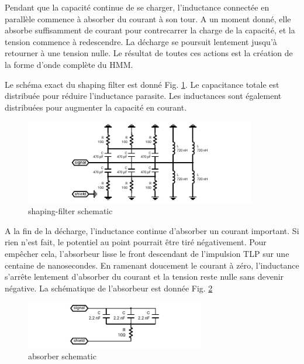 Pendant que la capacité continue de se charger, l'inductance connectée en parallèle commence à absorber du courant à son tour.
A un moment donné, elle absorbe suffisamment de courant pour contrecarrer la charge de la capacité, et la tension commence à redescendre.
La décharge se poursuit lentement jusqu'à retourner à une tension nulle.
Le résultat de toutes ces actions est la création de la forme d'onde complète du HMM.

Le schéma exact du shaping filter est donné Fig. \ref{fig:shaping_filter_schematic}.
Le capacitance totale est distribuée pour réduire l'inductance parasite.
Les inductances sont également distribuées pour augmenter la capacité en courant.

\begin{figure}[!h]
  \centering
  \includegraphics[width=0.9\textwidth]{src/1/figures/shaping_filter_schematic.pdf}
  \caption{shaping-filter schematic}
  \label{fig:shaping_filter_schematic}
\end{figure}

A la fin de la décharge, l'inductance continue d'absorber un courant important.
Si rien n'est fait, le potentiel au point pourrait être tiré négativement.
Pour empêcher cela, l'absorbeur lisse le front descendant de l'impulsion TLP sur une centaine de nanosecondes.
En ramenant doucement le courant à zéro, l'inductance s'arrête lentement d'absorber du courant et la tension reste nulle sans devenir négative.
La schématique de l'absorbeur est donnée Fig. \ref{fig:absorber_schematic}

\begin{figure}[!h]
  \centering
  \includegraphics[width=0.7\textwidth]{src/1/figures/absorber_schematic.pdf}
  \caption{absorber schematic}
  \label{fig:absorber_schematic}
\end{figure}

